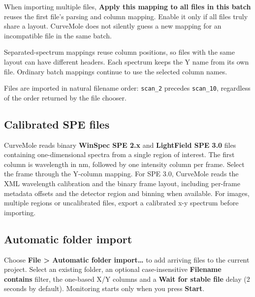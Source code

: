 \documentclass[
  10pt,
  a4paper,
  oneside]{scrreprt}
\begin{document}
When importing multiple files, \textbf{Apply this mapping to all files
in this batch} reuses the first file's parsing and column mapping.
Enable it only if all files truly share a layout. CurveMole does not
silently guess a new mapping for an incompatible file in the same batch.

Separated-spectrum mappings reuse column positions, so files with the
same layout can have different headers. Each spectrum keeps the Y name
from its own file. Ordinary batch mappings continue to use the selected
column names.

Files are imported in natural filename order: \texttt{scan\_2} precedes
\texttt{scan\_10}, regardless of the order returned by the file chooser.

\hypertarget{calibrated-spe-files}{%
\subsection{Calibrated SPE files}\label{calibrated-spe-files}}

CurveMole reads binary \textbf{WinSpec SPE 2.x} and \textbf{LightField
SPE 3.0} files containing one-dimensional spectra from a single region
of interest. The first column is wavelength in nm, followed by one
intensity column per frame. Select the frame through the Y-column
mapping. For SPE 3.0, CurveMole reads the XML wavelength calibration and
the binary frame layout, including per-frame metadata offsets and the
detector region and binning when available. For images, multiple regions
or uncalibrated files, export a calibrated x-y spectrum before
importing.

\hypertarget{automatic-folder-import}{%
\subsection{Automatic folder import}\label{automatic-folder-import}}

Choose \textbf{File \textgreater{} Automatic folder import\ldots{}} to
add arriving files to the current project. Select an existing folder, an
optional case-insensitive \textbf{Filename contains} filter, the
one-based X/Y columns and a \textbf{Wait for stable file} delay (2
seconds by default). Monitoring starts only when you press
\textbf{Start}.
\end{document}
